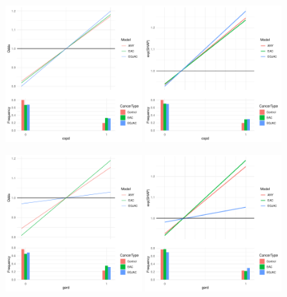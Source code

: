 \documentclass[12pt]{article}
\begin{document}
\begin{figure}[h]
\centering
\includegraphics[width=0.45\textwidth]{pdp/copd.pdf}
\includegraphics[width=0.45\textwidth]{shap/copd.pdf}
\end{figure}
\begin{figure}[h]
\centering
\includegraphics[width=0.45\textwidth]{pdp/gerd.pdf}
\includegraphics[width=0.45\textwidth]{shap/gerd.pdf}
\end{figure}
\end{document}
